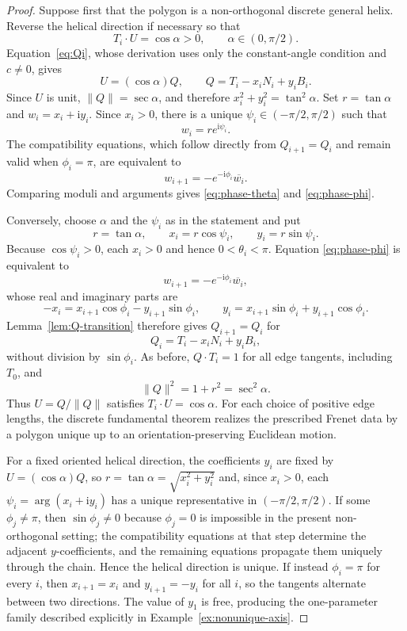 \documentclass[10pt,a4paper]{amsart}
\theoremstyle{definition}
\theoremstyle{remark}
\numberwithin{equation}{section}
\begin{document}
\begin{proof}
Suppose first that the polygon is a non-orthogonal discrete general helix. Reverse the helical direction if necessary so that
\[
T_i\cdot U=\cos\alpha>0,
\qquad \alpha\in(0,\pi/2).
\]
Equation~\eqref{eq:Qi}, whose derivation uses only the constant-angle condition and $c\ne0$, gives
\[
U=(\cos\alpha)Q,
\qquad
Q=T_i-x_iN_i+y_iB_i.
\]
Since $U$ is unit, $\|Q\|=\sec\alpha$, and therefore $x_i^2+y_i^2=\tan^2\alpha$. Set $r=\tan\alpha$ and $w_i=x_i+\mathrm{i}y_i$. Since $x_i>0$, there is a unique $\psi_i\in(-\pi/2,\pi/2)$ such that
\[
w_i=r e^{\mathrm{i}\psi_i}.
\]
The compatibility equations, which follow directly from $Q_{i+1}=Q_i$ and remain valid when $\phi_i=\pi$, are equivalent to
\[
w_{i+1}=-e^{-\mathrm{i}\phi_i}\overline{w_i}.
\]
Comparing moduli and arguments gives \eqref{eq:phase-theta} and \eqref{eq:phase-phi}.

Conversely, choose $\alpha$ and the $\psi_i$ as in the statement and put
\[
r=\tan\alpha,
\qquad x_i=r\cos\psi_i,
\qquad y_i=r\sin\psi_i.
\]
Because $\cos\psi_i>0$, each $x_i>0$ and hence $0<\theta_i<\pi$. Equation \eqref{eq:phase-phi} is equivalent to
\[
w_{i+1}=-e^{-\mathrm{i}\phi_i}\overline{w_i},
\]
whose real and imaginary parts are
\[
-x_i=x_{i+1}\cos\phi_i-y_{i+1}\sin\phi_i,
\qquad
y_i=x_{i+1}\sin\phi_i+y_{i+1}\cos\phi_i.
\]
Lemma~\ref{lem:Q-transition} therefore gives $Q_{i+1}=Q_i$ for
\[
Q_i=T_i-x_iN_i+y_iB_i,
\]
without division by $\sin\phi_i$. As before, $Q\cdot T_i=1$ for all edge tangents, including $T_0$, and
\[
\|Q\|^2=1+r^2=\sec^2\alpha.
\]
Thus $U=Q/\|Q\|$ satisfies $T_i\cdot U=\cos\alpha$. For each choice of positive edge lengths, the discrete fundamental theorem realizes the prescribed Frenet data by a polygon unique up to an orientation-preserving Euclidean motion.

For a fixed oriented helical direction, the coefficients $y_i$ are fixed by $U=(\cos\alpha)Q$, so $r=\tan\alpha=\sqrt{x_i^2+y_i^2}$ and, since $x_i>0$, each $\psi_i=\arg(x_i+\mathrm{i}y_i)$ has a unique representative in $(-\pi/2,\pi/2)$. If some $\phi_j\ne\pi$, then $\sin\phi_j\ne0$ because $\phi_j=0$ is impossible in the present non-orthogonal setting; the compatibility equations at that step determine the adjacent $y$-coefficients, and the remaining equations propagate them uniquely through the chain. Hence the helical direction is unique. If instead $\phi_i=\pi$ for every $i$, then $x_{i+1}=x_i$ and $y_{i+1}=-y_i$ for all $i$, so the tangents alternate between two directions. The value of $y_1$ is free, producing the one-parameter family described explicitly in Example~\ref{ex:nonunique-axis}.
\end{proof}
\end{document}
